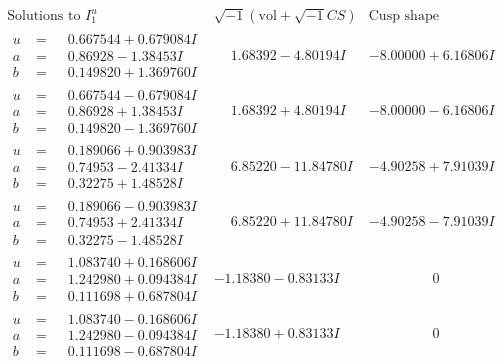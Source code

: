 \documentclass[1p]{elsarticle_modified}
\theoremstyle{definition}
\newcommand{\I}{\sqrt{-1}}
\begin{document}
$$\begin{array}{c|c|c}  
\text{Solutions to }I^u_{1}& \I (\text{vol} + \sqrt{-1}CS) & \text{Cusp shape}\\
 \hline 
\begin{aligned}
u &= \phantom{-}0.667544 + 0.679084 I \\
a &= \phantom{-}0.86928 - 1.38453 I \\
b &= \phantom{-}0.149820 + 1.369760 I\end{aligned}
 & \phantom{-}1.68392 - 4.80194 I & -8.00000 + 6.16806 I \\ \hline\begin{aligned}
u &= \phantom{-}0.667544 - 0.679084 I \\
a &= \phantom{-}0.86928 + 1.38453 I \\
b &= \phantom{-}0.149820 - 1.369760 I\end{aligned}
 & \phantom{-}1.68392 + 4.80194 I & -8.00000 - 6.16806 I \\ \hline\begin{aligned}
u &= \phantom{-}0.189066 + 0.903983 I \\
a &= \phantom{-}0.74953 - 2.41334 I \\
b &= \phantom{-}0.32275 + 1.48528 I\end{aligned}
 & \phantom{-}6.85220 - 11.84780 I & -4.90258 + 7.91039 I \\ \hline\begin{aligned}
u &= \phantom{-}0.189066 - 0.903983 I \\
a &= \phantom{-}0.74953 + 2.41334 I \\
b &= \phantom{-}0.32275 - 1.48528 I\end{aligned}
 & \phantom{-}6.85220 + 11.84780 I & -4.90258 - 7.91039 I \\ \hline\begin{aligned}
u &= \phantom{-}1.083740 + 0.168606 I \\
a &= \phantom{-}1.242980 + 0.094384 I \\
b &= \phantom{-}0.111698 + 0.687804 I\end{aligned}
 & -1.18380 - 0.83133 I & \phantom{-0.000000 } 0 \\ \hline\begin{aligned}
u &= \phantom{-}1.083740 - 0.168606 I \\
a &= \phantom{-}1.242980 - 0.094384 I \\
b &= \phantom{-}0.111698 - 0.687804 I\end{aligned}
 & -1.18380 + 0.83133 I & \phantom{-0.000000 } 0 \\ \hline\begin{aligned}

\end{aligned}
\end{array}$$
\end{document}
